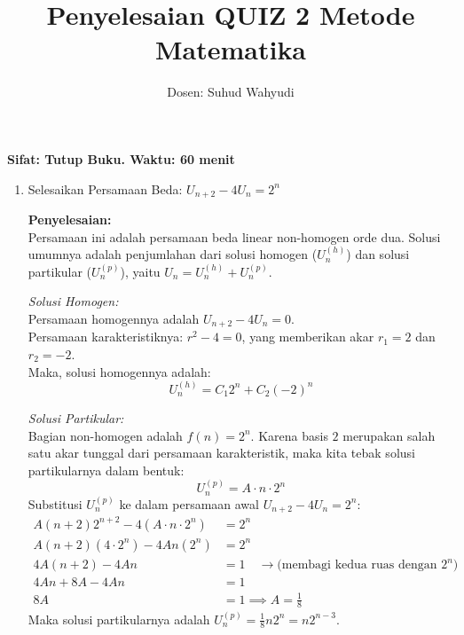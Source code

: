 \documentclass[11pt,a4paper]{article}
\title{\textbf{Penyelesaian QUIZ 2 Metode Matematika}}
\author{Dosen: Suhud Wahyudi}
\date{}
\begin{document}
\maketitle

\noindent\textbf{Sifat: Tutup Buku. Waktu: 60 menit}

\vspace{0.5cm}

\begin{enumerate}
  \item Selesaikan Persamaan Beda: $U_{n+2} - 4U_n = 2^n$

        \textbf{Penyelesaian:} \\
        Persamaan ini adalah persamaan beda linear non-homogen orde dua. Solusi umumnya adalah penjumlahan dari solusi homogen ($U_n^{(h)}$) dan solusi partikular ($U_n^{(p)}$), yaitu $U_n = U_n^{(h)} + U_n^{(p)}$.

        \textit{Solusi Homogen:} \\
        Persamaan homogennya adalah $U_{n+2} - 4U_n = 0$. \\
        Persamaan karakteristiknya: $r^2 - 4 = 0$, yang memberikan akar $r_1 = 2$ dan $r_2 = -2$. \\
        Maka, solusi homogennya adalah:
        \begin{equation*}
          U_n^{(h)} = C_1 2^n + C_2 (-2)^n
        \end{equation*}

        \textit{Solusi Partikular:} \\
        Bagian non-homogen adalah $f(n) = 2^n$. Karena basis $2$ merupakan salah satu akar tunggal dari persamaan karakteristik, maka kita tebak solusi partikularnya dalam bentuk:
        \begin{equation*}
          U_n^{(p)} = A \cdot n \cdot 2^n
        \end{equation*}
        Substitusi $U_n^{(p)}$ ke dalam persamaan awal $U_{n+2} - 4U_n = 2^n$:
        \begin{align*}
          A(n+2)2^{n+2} - 4(A \cdot n \cdot 2^n) & = 2^n                                                                \\
          A(n+2)(4 \cdot 2^n) - 4An(2^n)         & = 2^n                                                                \\
          4A(n+2) - 4An                          & = 1 \quad \rightarrow \text{(membagi kedua ruas dengan } 2^n\text{)} \\
          4An + 8A - 4An                         & = 1                                                                  \\
          8A                                     & = 1 \implies A = \frac{1}{8}
        \end{align*}
        Maka solusi partikularnya adalah $U_n^{(p)} = \frac{1}{8} n 2^n = n 2^{n-3}$.


\end{enumerate}
\end{document}
